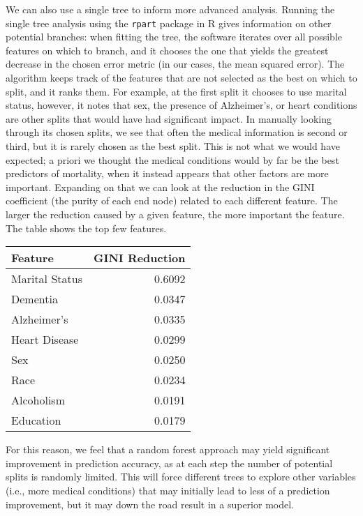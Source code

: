 \documentclass[letterpaper, 10 pt, conference]{ieeeconf}  %
\begin{document}
We can also use a single tree to inform more advanced analysis. Running the single tree analysis using the \texttt{rpart} package in R gives information on other potential branches: when fitting the tree, the software iterates over all possible features on which to branch, and it chooses the one that yields the greatest decrease in the chosen error metric (in our cases, the mean squared error). The algorithm keeps track of the features that are not selected as the best on which to split, and it ranks them. For example, at the first split it chooses to use marital status, however, it notes that sex, the presence of Alzheimer's, or heart conditions are other splits that would have had significant impact. In manually looking through its chosen splits, we see that often the medical information is second or third, but it is rarely chosen as the best split. This is not what we would have expected; a priori we thought the medical conditions would by far be the best predictors of mortality, when it instead appears that other factors are more important. Expanding on that we can look at the reduction in the GINI coefficient (the purity of each end node) related to each different feature. The larger the reduction caused by a given feature, the more important the feature. The table shows the top few features.
\begin{table}[ht]
\begin{center}
\begin{tabular}{lr}
\toprule
            Feature &    GINI Reduction \\
\midrule
Marital Status	& 0.6092		\\
   Dementia		& 0.0347	\\
 Alzheimer's	& 0.0335	\\
 Heart Disease	& 0.0299	\\
 Sex			& 0.0250	\\
 Race			& 0.0234	\\
 Alcoholism		& 0.0191	\\
 Education		& 0.0179	\\
\bottomrule
\end{tabular}
\end{center}
\end{table}
For this reason, we feel that a random forest approach may yield significant improvement in prediction accuracy, as at each step the number of potential splits is randomly limited. This will force different trees to explore other variables (i.e., more medical conditions) that may initially lead to less of a prediction improvement, but it may down the road result in a superior model.  
\end{document}
